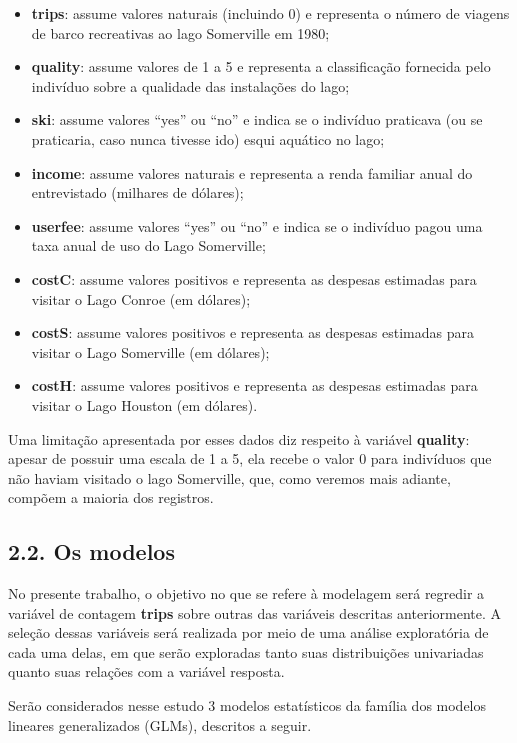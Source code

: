 \documentclass[
]{article}
\providecommand{\tightlist}{%
  \setlength{\itemsep}{0pt}\setlength{\parskip}{0pt}}
\begin{document}
\begin{itemize}
\tightlist
\item
  \textbf{trips}: assume valores naturais (incluindo 0) e representa o
  número de viagens de barco recreativas ao lago Somerville em 1980;
\item
  \textbf{quality}: assume valores de 1 a 5 e representa a classificação
  fornecida pelo indivíduo sobre a qualidade das instalações do lago;
\item
  \textbf{ski}: assume valores ``yes'' ou ``no'' e indica se o indivíduo
  praticava (ou se praticaria, caso nunca tivesse ido) esqui aquático no
  lago;
\item
  \textbf{income}: assume valores naturais e representa a renda familiar
  anual do entrevistado (milhares de dólares);
\item
  \textbf{userfee}: assume valores ``yes'' ou ``no'' e indica se o
  indivíduo pagou uma taxa anual de uso do Lago Somerville;
\item
  \textbf{costC}: assume valores positivos e representa as despesas
  estimadas para visitar o Lago Conroe (em dólares);
\item
  \textbf{costS}: assume valores positivos e representa as despesas
  estimadas para visitar o Lago Somerville (em dólares);
\item
  \textbf{costH}: assume valores positivos e representa as despesas
  estimadas para visitar o Lago Houston (em dólares).
\end{itemize}

Uma limitação apresentada por esses dados diz respeito à variável
\textbf{quality}: apesar de possuir uma escala de 1 a 5, ela recebe o
valor 0 para indivíduos que não haviam visitado o lago Somerville, que,
como veremos mais adiante, compõem a maioria dos registros.

\subsection{2.2. Os modelos}\label{os-modelos}

No presente trabalho, o objetivo no que se refere à modelagem será
regredir a variável de contagem \textbf{trips} sobre outras das
variáveis descritas anteriormente. A seleção dessas variáveis será
realizada por meio de uma análise exploratória de cada uma delas, em que
serão exploradas tanto suas distribuições univariadas quanto suas
relações com a variável resposta.

Serão considerados nesse estudo 3 modelos estatísticos da família dos
modelos lineares generalizados (GLMs), descritos a seguir.
\end{document}
